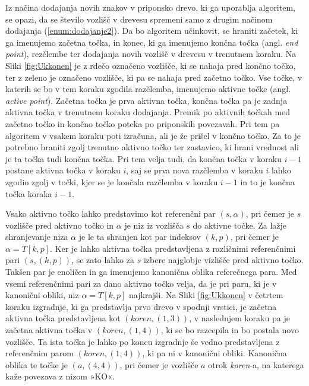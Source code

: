 Iz načina dodajanja novih znakov v priponsko drevo, ki ga uporablja algoritem, se opazi, da se število vozlišč v drevesu spremeni samo z drugim načinom dodajanja (\ref{enum:dodajanje2}). Da bo algoritem učinkovit, se hraniti začetek, ki ga imenujemo začetna točka, in konec, ki ga imenujemo končna točka (angl. \textit{end point}), rezčlembe ter dodajanja novih vozlišč v drevesu v trenutnem koraku. Na Sliki \ref{fig:Ukkonen} je z rdečo označeno vozlišče, ki se nahaja pred končno točko, ter z zeleno je označeno vozlišče, ki pa se nahaja pred začetno točko. Vse točke, v katerih se bo v tem koraku zgodila razčlemba, imenujemo aktivne točke (angl. \textit{active point}). Začetna točka je prva aktivna točka, končna točka pa je zadnja aktivna točka v trenutnem koraku dodajanja. Premik po aktivnih točkah med začetno točko in končno točko poteka po priponskih povezavah. Pri tem pa algoritem v vsakem koraku poti izračuna, ali je že prišel v končno točko. Za to je potrebno hraniti zgolj trenutno aktivno točko ter zastavico, ki hrani vrednost ali je ta točka tudi končna točka. Pri tem velja tudi, da končna točka v koraku $i-1$ postane aktivna točka v koraku $i$, saj se prva nova razčlemba v koraku $i$ lahko zgodio zgolj v točki, kjer se je končala razčlemba v koraku $i-1$ in to je končna točka koraka $i-1$. 

Vsako aktivno točko lahko predstavimo kot referenčni par $(s,\alpha)$, pri čemer je $s$ vozlišče pred aktivno točko in $\alpha$ je niz iz vozlišča $s$ do aktivne točke. Za lažje shranjevanje niza $\alpha$ je le ta shranjen kot par indeksov $(k,p)$, pri čemer je $\alpha=T[k,p]$. Ker je lahko aktivna točka predstavljena z različnimi referenčnimi pari $(s,(k,p))$, se zato lahko za $s$ izbere najglobje vizlišče pred aktivno točko. Takšen par je enoličen in ga imenujemo kanonična oblika referečnega para. Med vsemi referenčnimi pari za dano aktivno točko velja, da je pri paru, ki je v kanonični obliki, niz $\alpha=T[k,p]$ najkrajši. Na Sliki \ref{fig:Ukkonen} v četrtem koraku izgradnje, ki ga predstavlja prvo drevo v spodnji vrstici, je začetna aktivna točka predstavljena kot $(\textit{koren},(1,3))$, v naslednjem koraku pa je začetna aktivna točka v $(\textit{koren},(1,4))$, ki se bo razcepila in bo postala novo vozlišče. Ta ista točka je lahko po koncu izgradnje še vedno predstavljena z referenčnim parom $(\textit{koren},(1,4))$, ki pa ni v kanonični obliki. Kanonična oblika te točke je $(a,(4,4))$, pri čemer je vozlišče $a$ otrok \textit{koren}-a, na katerega kaže povezava z nizom »KO«.

